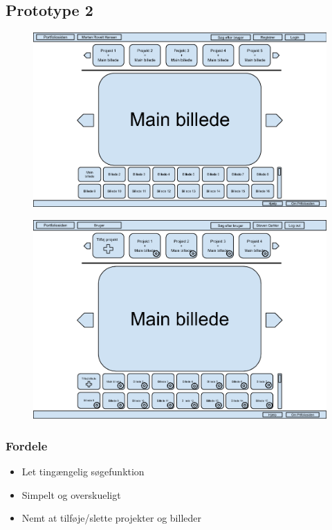 \documentclass[a4paper,titlepage,fleqn,12pt]{article}
\begin{document}
\subsection{Prototype 2}

\begin{figure}[H]
\includegraphics[width=\textwidth]{Prototype_1_not_logged_in.png}
\end{figure}

\begin{figure}[H]
\includegraphics[width=\textwidth]{Prototype_1_logged_in.png}
\end{figure}

\subsubsection{Fordele}
\begin{itemize}
\item Let tingængelig søgefunktion
\item Simpelt og overskueligt
\item Nemt at tilføje/slette projekter og billeder
\end{itemize}
\end{document}
